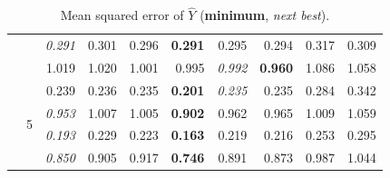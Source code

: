 \documentclass[authoryear, review, 11pt]{elsarticle}
\begin{document}
\begin{table}
\begin{center}
{\begin{tabular}{ccrrrrrrrr}
   &  & \emph{0.291} & 0.301 & 0.296 & \textbf{0.291} & 0.295 & 0.294 & 0.317 & 0.309 \\ 
   &  & 1.019 & 1.020 & 1.001 & 0.995 & \emph{0.992} & \textbf{0.960} & 1.086 & 1.058 \\ 
  \cline{3-10}
   & \multirow{4}{*}{5} & 0.239 & 0.236 & 0.235 & \textbf{0.201} & \emph{0.235} & 0.235 & 0.284 & 0.342 \\ 
   &  & \emph{0.953} & 1.007 & 1.005 & \textbf{0.902} & 0.962 & 0.965 & 1.009 & 1.059 \\ 
   &  & \emph{0.193} & 0.229 & 0.223 & \textbf{0.163} & 0.219 & 0.216 & 0.253 & 0.295 \\ 
   &  & \emph{0.850} & 0.905 & 0.917 & \textbf{0.746} & 0.891 & 0.873 & 0.987 & 1.044 \\ 
  \end{tabular}}
\caption{Mean squared error of $\hat{Y}$ (\textbf{minimum}, \emph{next best}).\label{table:Y-mse}}
\end{center}
\end{table}

	
\end{document}
